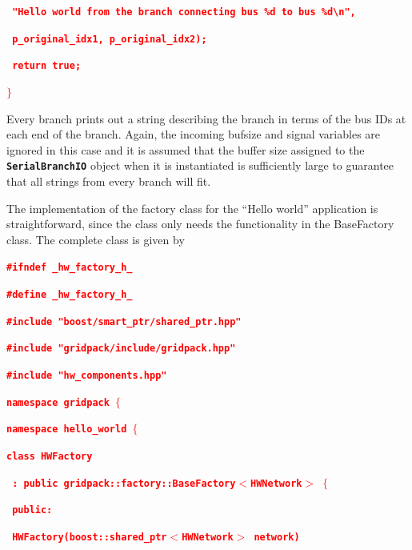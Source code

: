 \documentclass[12pt]{report} %
\begin{document}
\textcolor{red}{\texttt{\textbf{      "Hello world from the branch connecting bus \%d to bus \%d{\textbackslash}n",}}}

\textcolor{red}{\texttt{\textbf{      p\_original\_idx1, p\_original\_idx2);}}}

\textcolor{red}{\texttt{\textbf{  return true;}}}

\textcolor{red}{\texttt{\textbf{$\boldsymbol{\mathrm{\}}}$}}}

Every branch prints out a string describing the branch in terms of the bus IDs at each end of the branch. Again, the incoming bufsize and signal variables are ignored in this case and it is assumed that the buffer size assigned to the \texttt{\textbf{SerialBranchIO}} object when it is instantiated is sufficiently large to guarantee that all strings from every branch will fit. 

The implementation of the factory class for the ``Hello world'' application is straightforward, since the class only needs the functionality in the BaseFactory class. The complete class is given by

\textcolor{red}{\texttt{\textbf{\#ifndef \_hw\_factory\_h\_}}}

\textcolor{red}{\texttt{\textbf{\#define \_hw\_factory\_h\_}}}

\textcolor{red}{\texttt{\textbf{}}}

\textcolor{red}{\texttt{\textbf{\#include "boost/smart\_ptr/shared\_ptr.hpp"}}}

\textcolor{red}{\texttt{\textbf{\#include "gridpack/include/gridpack.hpp"}}}

\textcolor{red}{\texttt{\textbf{\#include "hw\_components.hpp"}}}

\textcolor{red}{\texttt{\textbf{}}}

\textcolor{red}{\texttt{\textbf{namespace gridpack $\boldsymbol{\mathrm{\{}}$}}}

\textcolor{red}{\texttt{\textbf{namespace hello\_world $\boldsymbol{\mathrm{\{}}$}}}

\textcolor{red}{\texttt{\textbf{}}}

\textcolor{red}{\texttt{\textbf{class HWFactory}}}

\textcolor{red}{\texttt{\textbf{  : public gridpack::factory::BaseFactory$\boldsymbol{\mathrm{<}}$HWNetwork$\boldsymbol{\mathrm{>}}$ $\boldsymbol{\mathrm{\{}}$}}}

\textcolor{red}{\texttt{\textbf{  public:}}}

\textcolor{red}{\texttt{\textbf{    HWFactory(boost::shared\_ptr$\boldsymbol{\mathrm{<}}$HWNetwork$\boldsymbol{\mathrm{>}}$ network)}}}
\end{document}
